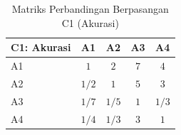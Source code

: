 \begin{table}[H]
	\centering
	\caption{Matriks Perbandingan Berpasangan C1 (Akurasi)}
	\label{tab:perbandingan_c1}
	\begin{tabular}{|l|c|c|c|c|}
		\hline
		C1: Akurasi & A1 & A2 & A3 & A4 \\ \hline
		A1 & $1$ & $2$ & $7$ & $4$ \\ \hline
		A2 & $1/2$ & $1$ & $5$ & $3$ \\ \hline
		A3 & $1/7$ & $1/5$ & $1$ & $1/3$ \\ \hline
		A4 & $1/4$ & $1/3$ & $3$ & $1$ \\ \hline
	\end{tabular}
\end{table}